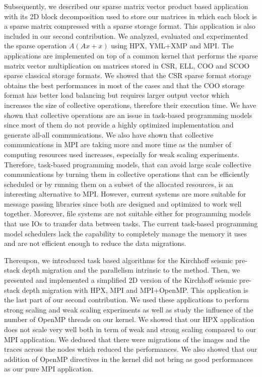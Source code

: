 Subsequently, we described our sparse matrix vector product based application with its 2D block decomposition used to store our matrices in which each block is a sparse matrix compressed with a sparse storage format.
This application is also included in our second contribution.
We analyzed, evaluated and experimented the sparse operation $A(Ax+x)$ using HPX, YML+XMP and MPI.
The applications are implemented on top of a common kernel that performs the sparse matrix vector multiplication on matrices stored in CSR, ELL, COO and SCOO sparse classical storage formats.
We showed that the CSR sparse format storage obtains the best performances in most of the cases and that the COO storage format has better load balancing but requires larger output vector which increases the size of collective operations, therefore their execution time.
We have shown that collective operations are an issue in task-based programming models since most of them do not provide a highly optimized implementation and generate all-all communications.
We also have shown that collective communications in MPI are taking more and more time as the number of computing resources used increases, especially for weak scaling experiments.
Therefore, task-based programming models, that can avoid large scale collective communications by turning them in collective operations that can be efficiently scheduled or by running them on a subset of the allocated resources, is an interesting alternative to MPI.
However, current systems are more suitable for message passing libraries since both are designed and optimized to work well together.
Moreover, file systems are not suitable either for programming models that use IOs to transfer data between tasks.
The current task-based programming model schedulers lack the capability to completely manage the memory it uses and are not efficient enough to reduce the data migrations.

Thereupon, we introduced task based algorithms for the Kirchhoff seismic pre-stack depth migration and the parallelism intrinsic to the method.
Then, we presented and implemented a simplified 2D version of the Kirchhoff seismic pre-stack depth migration with HPX, MPI and MPI+OpenMP.
This application is the last part of our second contribution.
We used these applications to perform strong scaling and weak scaling experiments as well as study the influence of the number of OpenMP threads on our kernel.
We showed that our HPX application does not scale very well both in term of weak and strong scaling compared to our MPI application.
We deduced that there were migrations of the images and the traces across the nodes which reduced the performances.
We also showed that our addition of OpenMP directives in the kernel did not bring as good performances as our pure MPI application.

